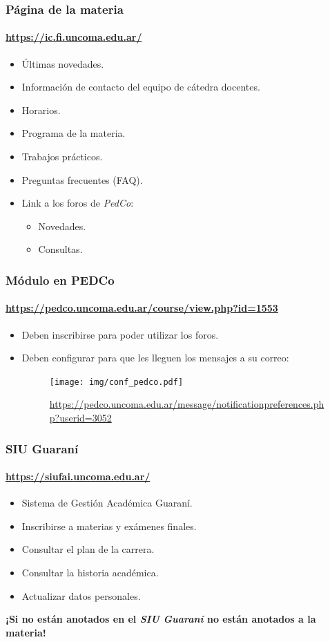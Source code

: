 \documentclass[11pt,a4paper,spanish]{beamer}
\begin{document}
\begin{frame}

    \frametitle{Página de la materia}
    \framesubtitle{\url{https://ic.fi.uncoma.edu.ar/}}

\begin{itemize}
    \item Últimas novedades.
    \item Información de contacto del equipo de cátedra docentes.
    \item Horarios.
    \item Programa de la materia.
    \item Trabajos prácticos.
    \item Preguntas frecuentes (FAQ).
    \item Link a los foros de \emph{PedCo}:
        \begin{itemize}
            \item Novedades.
            \item Consultas.
        \end{itemize}
\end{itemize}

\end{frame}

\begin{frame}

    \frametitle{Módulo en PEDCo}
    \framesubtitle{\url{https://pedco.uncoma.edu.ar/course/view.php?id=1553}}

\begin{itemize}
    \item Deben inscribirse para poder utilizar los foros.
    \item Deben configurar para que les lleguen los mensajes a su correo:
    \begin{figure}
        \texttt{[image: img/conf\_pedco.pdf]}
        \captionsetup{textfont=tiny,labelformat=empty}
        \caption{\url{https://pedco.uncoma.edu.ar/message/notificationpreferences.php?userid=3052}}
    \end{figure}
\end{itemize}

\end{frame}

\begin{frame}

    \frametitle{SIU Guaraní}
    \framesubtitle{\url{https://siufai.uncoma.edu.ar/}}

\begin{itemize}
    \item Sistema de Gestión Académica Guaraní.
    \item Inscribirse a materias y exámenes finales.
    \item Consultar el plan de la carrera.
    \item Consultar la historia académica.
    \item Actualizar datos personales.
\end{itemize}

\textbf{¡Si no están anotados en el \emph{SIU Guaraní} no están anotados a la
    materia!}

\end{frame}
\end{document}
